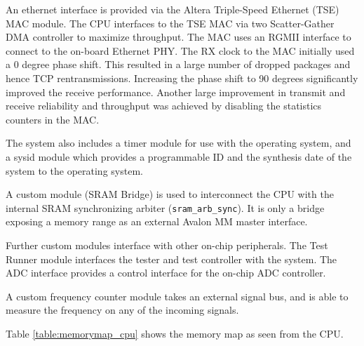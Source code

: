 An ethernet interface is provided via the Altera Triple-Speed Ethernet (TSE) MAC module. The
CPU interfaces to the TSE MAC via two Scatter-Gather DMA controller to maximize throughput. The
MAC uses an RGMII interface to connect to the on-board Ethernet PHY. The RX clock to the MAC
initially used a 0 degree phase shift. This resulted in a large number of dropped packages and
hence TCP rentransmissions. Increasing the phase shift to 90 degrees significantly improved
the receive performance. Another large improvement in transmit and receive reliability and
throughput was achieved by disabling the statistics counters in the MAC.

The system also includes a timer module for use with the operating system, and a sysid module
which provides a programmable ID and the synthesis date of the system to the operating system.

A custom module (SRAM Bridge) is used to interconnect the CPU with the internal SRAM synchronizing
arbiter (\texttt{sram\_arb\_sync}). It is only a bridge exposing a memory range as an external
Avalon MM master interface.

Further custom modules interface with other on-chip peripherals. The Test Runner module
interfaces the tester and test controller with the system. The ADC interface provides a control
interface for the on-chip ADC controller.

A custom frequency counter module takes an external signal bus, and is able to measure the frequency
on any of the incoming signals.

Table \ref{table:memorymap_cpu} shows the memory map as seen from the CPU.

